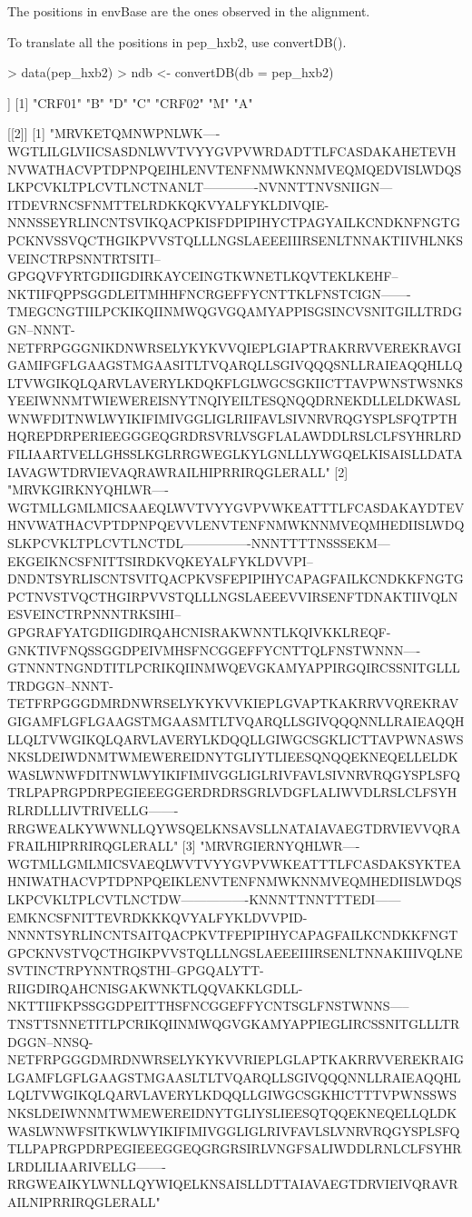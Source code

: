 \documentclass[11pt]{article}
\begin{document}
The positions in envBase are the ones observed in the alignment.

To translate all the positions in pep_hxb2, use convertDB().
\begin{Schunk}
\begin{Sinput}
> data(pep_hxb2)
> ndb <- convertDB(db = pep_hxb2)
\end{Sinput}
\begin{Soutput}
[[1]]
[1] "CRF01" "B"     "D"     "C"     "CRF02" "M"     "A"    

[[2]]
[1] "MRVKETQMNWPNLWK----WGTLILGLVIICSASDNLWVTVYYGVPVWRDADTTLFCASDAKAHETEVHNVWATHACVPTDPNPQEIHLENVTENFNMWKNNMVEQMQEDVISLWDQSLKPCVKLTPLCVTLNCTNANLT-------------NVNNTTNVSNIIGN---ITDEVRNCSFNMTTELRDKKQKVYALFYKLDIVQIE-NNNSSEYRLINCNTSVIKQACPKISFDPIPIHYCTPAGYAILKCNDKNFNGTGPCKNVSSVQCTHGIKPVVSTQLLLNGSLAEEEIIIRSENLTNNAKTIIVHLNKSVEINCTRPSNNTRTSITI--GPGQVFYRTGDIIGDIRKAYCEINGTKWNETLKQVTEKLKEHF--NKTIIFQPPSGGDLEITMHHFNCRGEFFYCNTTKLFNSTCIGN-------TMEGCNGTIILPCKIKQIINMWQGVGQAMYAPPISGSINCVSNITGILLTRDGGN--NNNT-NETFRPGGGNIKDNWRSELYKYKVVQIEPLGIAPTRAKRRVVEREKRAVGIGAMIFGFLGAAGSTMGAASITLTVQARQLLSGIVQQQSNLLRAIEAQQHLLQLTVWGIKQLQARVLAVERYLKDQKFLGLWGCSGKIICTTAVPWNSTWSNKSYEEIWNNMTWIEWEREISNYTNQIYEILTESQNQQDRNEKDLLELDKWASLWNWFDITNWLWYIKIFIMIVGGLIGLRIIFAVLSIVNRVRQGYSPLSFQTPTHHQREPDRPERIEEGGGEQGRDRSVRLVSGFLALAWDDLRSLCLFSYHRLRDFILIAARTVELLGHSSLKGLRRGWEGLKYLGNLLLYWGQELKISAISLLDATAIAVAGWTDRVIEVAQRAWRAILHIPRRIRQGLERALL"
[2] "MRVKGIRKNYQHLWR----WGTMLLGMLMICSAAEQLWVTVYYGVPVWKEATTTLFCASDAKAYDTEVHNVWATHACVPTDPNPQEVVLENVTENFNMWKNNMVEQMHEDIISLWDQSLKPCVKLTPLCVTLNCTDL----------------NNNTTTTNSSSEKM---EKGEIKNCSFNITTSIRDKVQKEYALFYKLDVVPI--DNDNTSYRLISCNTSVITQACPKVSFEPIPIHYCAPAGFAILKCNDKKFNGTGPCTNVSTVQCTHGIRPVVSTQLLLNGSLAEEEVVIRSENFTDNAKTIIVQLNESVEINCTRPNNNTRKSIHI--GPGRAFYATGDIIGDIRQAHCNISRAKWNNTLKQIVKKLREQF-GNKTIVFNQSSGGDPEIVMHSFNCGGEFFYCNTTQLFNSTWNNN----GTNNNTNGNDTITLPCRIKQIINMWQEVGKAMYAPPIRGQIRCSSNITGLLLTRDGGN--NNNT-TETFRPGGGDMRDNWRSELYKYKVVKIEPLGVAPTKAKRRVVQREKRAVGIGAMFLGFLGAAGSTMGAASMTLTVQARQLLSGIVQQQNNLLRAIEAQQHLLQLTVWGIKQLQARVLAVERYLKDQQLLGIWGCSGKLICTTAVPWNASWSNKSLDEIWDNMTWMEWEREIDNYTGLIYTLIEESQNQQEKNEQELLELDKWASLWNWFDITNWLWYIKIFIMIVGGLIGLRIVFAVLSIVNRVRQGYSPLSFQTRLPAPRGPDRPEGIEEEGGERDRDRSGRLVDGFLALIWVDLRSLCLFSYHRLRDLLLIVTRIVELLG-------RRGWEALKYWWNLLQYWSQELKNSAVSLLNATAIAVAEGTDRVIEVVQRAFRAILHIPRRIRQGLERALL"
[3] "MRVRGIERNYQHLWR----WGTMLLGMLMICSVAEQLWVTVYYGVPVWKEATTTLFCASDAKSYKTEAHNIWATHACVPTDPNPQEIKLENVTENFNMWKNNMVEQMHEDIISLWDQSLKPCVKLTPLCVTLNCTDW----------------KNNNTTNNTTTEDI------EMKNCSFNITTEVRDKKKQVYALFYKLDVVPID-NNNNTSYRLINCNTSAITQACPKVTFEPIPIHYCAPAGFAILKCNDKKFNGTGPCKNVSTVQCTHGIKPVVSTQLLLNGSLAEEEIIIRSENLTNNAKIIIVQLNESVTINCTRPYNNTRQSTHI--GPGQALYTT-RIIGDIRQAHCNISGAKWNKTLQQVAKKLGDLL-NKTTIIFKPSSGGDPEITTHSFNCGGEFFYCNTSGLFNSTWNNS-----TNSTTSNNETITLPCRIKQIINMWQGVGKAMYAPPIEGLIRCSSNITGLLLTRDGGN--NNSQ-NETFRPGGGDMRDNWRSELYKYKVVRIEPLGLAPTKAKRRVVEREKRAIGLGAMFLGFLGAAGSTMGAASLTLTVQARQLLSGIVQQQNNLLRAIEAQQHLLQLTVWGIKQLQARVLAVERYLKDQQLLGIWGCSGKHICTTTVPWNSSWSNKSLDEIWNNMTWMEWEREIDNYTGLIYSLIEESQTQQEKNEQELLQLDKWASLWNWFSITKWLWYIKIFIMIVGGLIGLRIVFAVLSLVNRVRQGYSPLSFQTLLPAPRGPDRPEGIEEEGGEQGRGRSIRLVNGFSALIWDDLRNLCLFSYHRLRDLILIAARIVELLG-------RRGWEAIKYLWNLLQYWIQELKNSAISLLDTTAIAVAEGTDRVIEIVQRAVRAILNIPRRIRQGLERALL"

\end{Soutput}
\end{Schunk}
\end{document}

